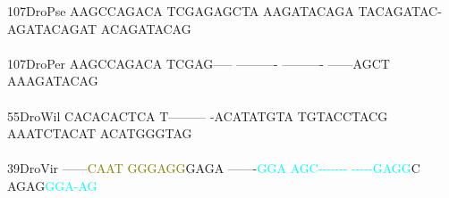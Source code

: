 \documentclass[11pt,twoside,reqno,a4paper]{article}
\begin{document}
{107\hspace*{1\charwidth}DroPse	AAGCCAGACA	TCGAGAGCTA	AAGATACAGA	TACAGATAC-	AGATACAGAT	ACAGATACAG	\\
\hspace*{4\charwidth}\hspace*{7\charwidth}\hspace*{1\charwidth}\hspace*{1\charwidth}\hspace*{1\charwidth}\hspace*{1\charwidth}\hspace*{1\charwidth}\hspace*{1\charwidth}\\
107\hspace*{1\charwidth}DroPer	AAGCCAGACA	TCGAG-----	----------	----------	------AGCT	AAAGATACAG	\\
\hspace*{4\charwidth}\hspace*{7\charwidth}\hspace*{1\charwidth}\hspace*{1\charwidth}\hspace*{1\charwidth}\hspace*{1\charwidth}\hspace*{1\charwidth}\hspace*{1\charwidth}\\
55\hspace*{2\charwidth}DroWil	CACACACTCA	T---------	-ACATATGTA	TGTACCTACG	AAATCTACAT	ACATGGGTAG	\\
\hspace*{4\charwidth}\hspace*{7\charwidth}\hspace*{1\charwidth}\hspace*{1\charwidth}\hspace*{1\charwidth}\hspace*{1\charwidth}\hspace*{1\charwidth}\hspace*{1\charwidth}\\
39\hspace*{2\charwidth}DroVir	------\textcolor{olive}{C}\textcolor{olive}{A}\textcolor{olive}{A}\textcolor{olive}{T}	\textcolor{olive}{G}\textcolor{olive}{G}\textcolor{olive}{G}\textcolor{olive}{A}\textcolor{olive}{G}\textcolor{olive}{G}GAGA	-------\textcolor{cyan}{G}\textcolor{cyan}{G}\textcolor{cyan}{A}	\textcolor{cyan}{A}\textcolor{cyan}{G}\textcolor{cyan}{C}\textcolor{cyan}{-}\textcolor{cyan}{-}\textcolor{cyan}{-}\textcolor{cyan}{-}\textcolor{cyan}{-}\textcolor{cyan}{-}\textcolor{cyan}{-}	\textcolor{cyan}{-}\textcolor{cyan}{-}\textcolor{cyan}{-}\textcolor{cyan}{-}\textcolor{cyan}{-}\textcolor{cyan}{G}\textcolor{cyan}{A}\textcolor{cyan}{G}\textcolor{cyan}{G}C	AGAG\textcolor{cyan}{G}\textcolor{cyan}{G}\textcolor{cyan}{A}\textcolor{cyan}{-}\textcolor{cyan}{A}\textcolor{cyan}{G}	\\
}
\end{document}
